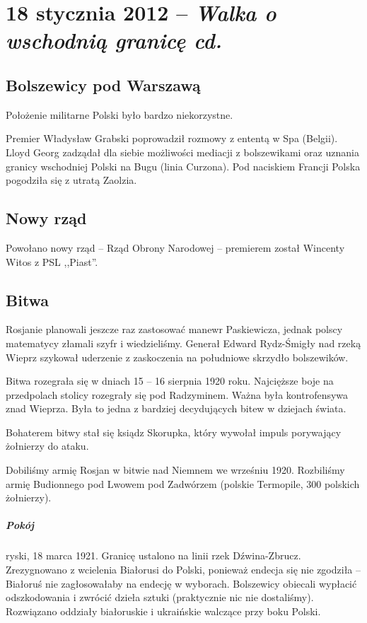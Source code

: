 \documentclass [a4paper, 11pt, oneside]{book}
\begin{document}
\chapter{18 stycznia 2012 -- \textit{Walka o wschodnią granicę cd.}} %
\label{cha:18_stycznia_2012_textit}
    \section{Bolszewicy pod Warszawą} %
    \label{sec:bolszewicy_pod_warszaw_}
        Położenie militarne Polski było bardzo niekorzystne.

        Premier Władysław Grabski poprowadził rozmowy z ententą w Spa (Belgii). Lloyd Georg zadządał dla siebie możliwości mediacji z bolszewikami oraz uznania granicy wschodniej Polski na Bugu (linia Curzona). Pod naciskiem Francji Polska pogodziła się z utratą Zaolzia.
    \section{Nowy rząd} %
    \label{sec:nowy_rz_d}
        Powołano nowy rząd -- Rząd Obrony Narodowej -- premierem został Wincenty Witos z PSL ,,Piast''.
    \section{Bitwa} %
    \label{sec:bitwa}
        Rosjanie planowali jeszcze raz zastosować manewr Paskiewicza, jednak polscy matematycy złamali szyfr i wiedzieliśmy. Generał Edward Rydz-Śmigły nad rzeką Wieprz szykował uderzenie z zaskoczenia na południowe skrzydło bolszewików.

        Bitwa rozegrała się w dniach 15 -- 16 sierpnia 1920 roku. Najcięższe boje na przedpolach stolicy rozegrały się pod Radzyminem. Ważna była kontrofensywa znad Wieprza. Była to jedna z bardziej decydujących bitew w dziejach świata.

        Bohaterem bitwy stał się ksiądz Skorupka, który wywołał impuls porywający żołnierzy do ataku.

        Dobiliśmy armię Rosjan w bitwie nad Niemnem we wrześniu 1920. Rozbiliśmy armię Budionnego pod Lwowem pod Zadwórzem (polskie Termopile, 300 polskich żołnierzy).

        \paragraph{Pokój} ryski, 18 marca 1921. Granicę ustalono na linii rzek Dźwina-Zbrucz. Zrezygnowano z wcielenia Białorusi do Polski, ponieważ endecja się nie zgodziła -- Białoruś nie zagłosowałaby na endecję w wyborach. Bolszewicy obiecali wypłacić odszkodowania i zwrócić dzieła sztuki (praktycznie nic nie dostaliśmy). Rozwiązano oddziały białoruskie i ukraińskie walczące przy boku Polski.
\end{document}
